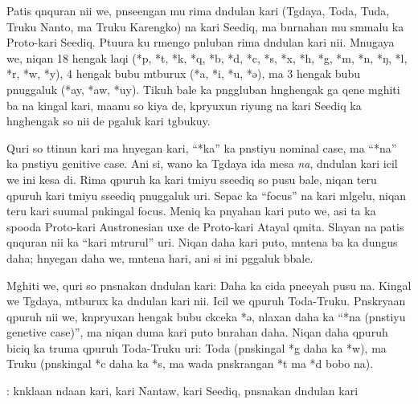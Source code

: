\vspace{-1.15cm}

Patis qnquran nii we, pnseengan mu rima dndulan kari (Tgdaya, Toda, Tuda, Truku Nanto, ma Truku Karengko) na kari Seediq, ma bnrnahan mu smmalu ka Proto-kari Seediq. Ptuura ku rmengo pnluban rima dndulan kari nii. Mnugaya we, niqan 18 hengak laqi (*p, *t, *k, *q, *b, *d, *c, *s, *x, *h, *g, *m, *n, *ŋ, *l, *r, *w, *y), 4 hengak bubu mtburux (*a, *i, *u, *ə), ma 3 hengak bubu pnuggaluk (*ay, *aw, *uy). Tikuh bale ka pnggluban hnghengak ga qene mghiti ba na kingal kari, maanu so kiya de, kpryuxun riyung na kari Seediq ka hnghengak so nii de pgaluk kari tgbukuy.

Quri so ttinun kari ma hnyegan kari, ``*ka'' ka pnstiyu nominal case, ma ``*na'' ka pnstiyu genitive case. Ani si, wano ka Tgdaya ida mesa \textit{na}, dndulan kari icil we ini kesa di. Rima qpuruh ka kari tmiyu sseediq so pusu bale, niqan teru qpuruh kari tmiyu sseediq pnuggaluk uri. Sepac ka ``focus'' na kari mlgelu, niqan teru kari suumal pnkingal focus. Meniq ka pnyahan kari puto we, asi ta ka spooda Proto-kari Austronesian uxe de Proto-kari Atayal qmita. Slayan na patis qnquran nii ka ``kari mtrurul'' uri. Niqan daha kari puto, mntena ba ka dungus daha; hnyegan daha we, mntena hari, ani si ini pggaluk bbale. 

Mghiti we, quri so pnsnakan dndulan kari: Daha ka cida pneeyah pusu na. Kingal we Tgdaya, mtburux ka dndulan kari nii. Icil we qpuruh Toda-Truku. Pnskryaan qpuruh nii we, knpryuxan hengak bubu ckceka *ə, nlaxan daha ka ``*na (pnstiyu genetive case)'', ma niqan duma kari puto bnrahan daha. Niqan daha qpuruh biciq ka truma qpuruh Toda-Truku uri: Toda (pnskingal *g daha ka *w), ma Truku (pnskingal *c daha ka *s, ma wada pnskrangan *t ma *d bobo na).

: knklaan ndaan kari, kari Nantaw, kari Seediq, pnsnakan dndulan kari